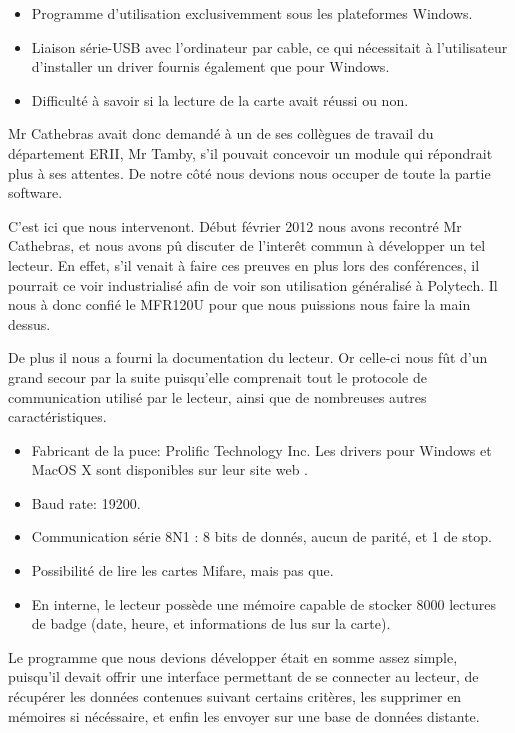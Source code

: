     \begin{itemize}
        \item Programme d'utilisation exclusivemment sous les plateformes Windows.
        \item Liaison série-USB avec l'ordinateur par cable, ce qui nécessitait 
              à l'utilisateur d'installer un driver fournis également que pour
              Windows.
        \item Difficulté à savoir si la lecture de la carte avait réussi ou non.
    \end{itemize}

    Mr Cathebras avait donc demandé à un de ses collègues de travail du département
ERII, Mr Tamby, s'il pouvait concevoir un module qui répondrait plus à ses attentes.
De notre côté nous devions nous occuper de toute la partie software.

    C'est ici que nous intervenont. Début février 2012 nous avons recontré Mr Cathebras,
et nous avons pû discuter de l'interêt commun à développer un tel lecteur. En effet,
s'il venait à faire ces preuves en plus lors des conférences, il pourrait ce voir
industrialisé afin de voir son utilisation généralisé à Polytech. Il nous à donc
confié le MFR120U pour que nous puissions nous faire la main dessus.

    De plus il nous a fourni la documentation du lecteur. Or celle-ci nous fût d'un
grand secour par la suite puisqu'elle comprenait tout le protocole de communication
utilisé par le lecteur, ainsi que de nombreuses autres caractéristiques.

    \begin{itemize}
        \item Fabricant de la puce: Prolific Technology Inc. Les drivers pour Windows
              et MacOS X sont disponibles sur leur site web \cite{prolific}.
        \item Baud rate: 19200.
        \item Communication série 8N1 : 8 bits de donnés, aucun de parité, et 1 de stop.
        \item Possibilité de lire les cartes Mifare, mais pas que.
        \item En interne, le lecteur possède une mémoire capable de stocker 8000
              lectures de badge (date, heure, et informations de lus sur la carte).
    \end{itemize}

    Le programme que nous devions développer était en somme assez simple, puisqu'il
devait offrir une interface permettant de se connecter au lecteur, de récupérer les
données contenues suivant certains critères, les supprimer en mémoires si nécéssaire,
et enfin les envoyer sur une base de données distante.

